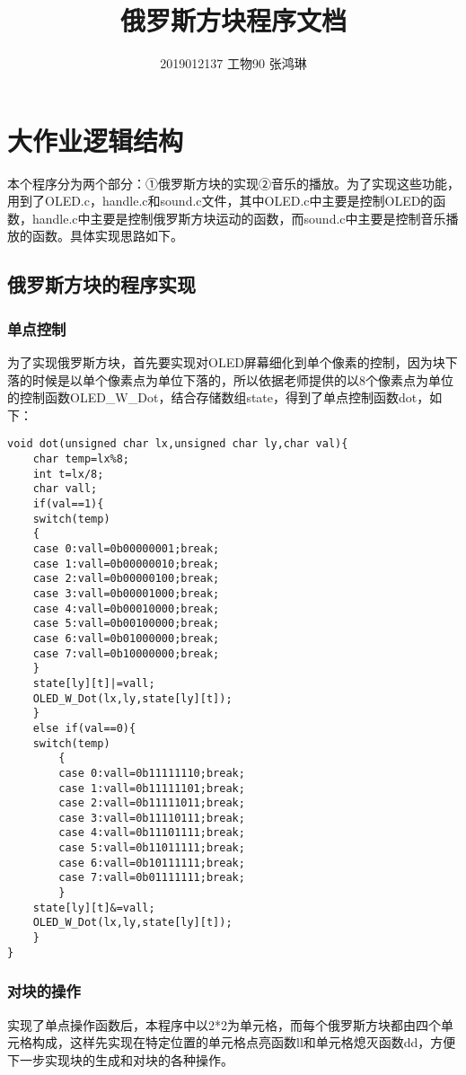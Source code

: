 \documentclass[UTF8]{ctexart}
\begin{document}
\title{俄罗斯方块程序文档}
\author{2019012137  工物90  张鸿琳}
\maketitle

\newpage
\tableofcontents
\newpage

\section{大作业逻辑结构}
本个程序分为两个部分：①俄罗斯方块的实现②音乐的播放。为了实现这些功能，用到了OLED.c，handle.c和sound.c文件，其中OLED.c中主要是控制OLED的函数，handle.c中主要是控制俄罗斯方块运动的函数，而sound.c中主要是控制音乐播放的函数。具体实现思路如下。

\subsection{俄罗斯方块的程序实现}
\subsubsection{单点控制}
为了实现俄罗斯方块，首先要实现对OLED屏幕细化到单个像素的控制，因为块下落的时候是以单个像素点为单位下落的，所以依据老师提供的以8个像素点为单位的控制函数OLED\_W\_Dot，结合存储数组state，得到了单点控制函数dot，如下：
\begin{lstlisting}
void dot(unsigned char lx,unsigned char ly,char val){
	char temp=lx%8;
	int t=lx/8;
	char vall;
	if(val==1){
	switch(temp)
	{
	case 0:vall=0b00000001;break;
	case 1:vall=0b00000010;break;
	case 2:vall=0b00000100;break;
	case 3:vall=0b00001000;break;
	case 4:vall=0b00010000;break;
	case 5:vall=0b00100000;break;
	case 6:vall=0b01000000;break;
	case 7:vall=0b10000000;break;
	}
	state[ly][t]|=vall;
	OLED_W_Dot(lx,ly,state[ly][t]);
	}
	else if(val==0){
	switch(temp)
		{
		case 0:vall=0b11111110;break;
		case 1:vall=0b11111101;break;
		case 2:vall=0b11111011;break;
		case 3:vall=0b11110111;break;
		case 4:vall=0b11101111;break;
		case 5:vall=0b11011111;break;
		case 6:vall=0b10111111;break;
		case 7:vall=0b01111111;break;
		}
	state[ly][t]&=vall;
	OLED_W_Dot(lx,ly,state[ly][t]);
	}
}
\end{lstlisting}

\subsubsection{对块的操作}
实现了单点操作函数后，本程序中以2*2为单元格，而每个俄罗斯方块都由四个单元格构成，这样先实现在特定位置的单元格点亮函数ll和单元格熄灭函数dd，方便下一步实现块的生成和对块的各种操作。
\end{document}
